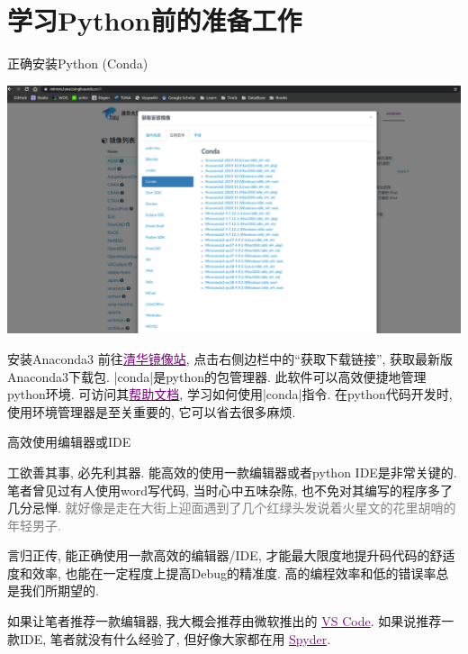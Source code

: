 \documentclass{beamer}
\newcommand{\purple}{\textcolor{purple}}
\begin{document}
  \section{学习Python前的准备工作}
    \begin{frame}[fragile]{正确安装Python (Conda)}
      \begin{center}
        \begin{tcolorbox}[beamer,width=0.76\textwidth,arc=0pt,boxsep=0pt,left=0pt,right=0pt,top=0pt,bottom=0pt]
          \includegraphics[width=\textwidth]{figure/conda.png}
        \end{tcolorbox}
      \end{center}
      \begin{block}{\small 安装Anaconda3}\small 
        前往\href{https://mirrors.tuna.tsinghua.edu.cn/}{\purple{清华镜像站}}, 点击右侧边栏中的``获取下载链接'', 获取最新版Anaconda3下载包. \cverb|conda|是python的包管理器. 此软件可以高效便捷地管理python环境. 可访问其\href{https://docs.conda.io/projects/conda/en/latest/user-guide/getting-started.html}{\purple{帮助文档}}, 学习如何使用\cverb|conda|指令. 在python代码开发时, 使用环境管理器是至关重要的, 它可以省去很多麻烦.
      \end{block}
    \end{frame}

    \begin{frame}{高效使用编辑器或IDE}
      \begin{block}{工欲善其事, 必先利其器.}
        能高效的使用一款编辑器或者python IDE是非常关键的. 笔者曾见过有人使用word写代码, 当时心中五味杂陈, 也不免对其编写的程序多了几分忌惮. \textcolor{gray}{就好像是走在大街上迎面遇到了几个红绿头发说着火星文的花里胡哨的年轻男子.}

        言归正传, 能正确使用一款高效的编辑器/IDE, 才能最大限度地提升码代码的舒适度和效率, 也能在一定程度上提高Debug的精准度. 高的编程效率和低的错误率总是我们所期望的.
        
        如果让笔者推荐一款编辑器, 我大概会推荐由微软推出的 \href{https://code.visualstudio.com}{\purple{VS Code}}. 如果说推荐一款IDE, 笔者就没有什么经验了, 但好像大家都在用 \href{https://www.spyder-ide.org}{\purple{Spyder}}. 
      \end{block}
    \end{frame}
\end{document}
